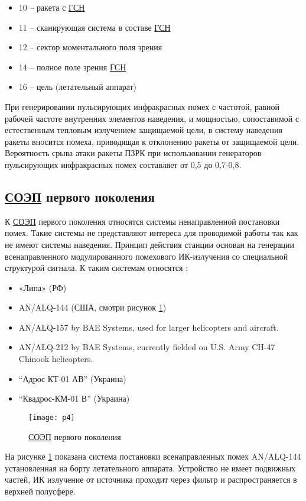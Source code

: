 \begin{itemize}
	\item 10 – ракета с \hyperref[acroGSN]{ГСН}
	\item 11 – сканирующая система в составе \hyperref[acroGSN]{ГСН}
	\item 12 – сектор моментального поля зрения
	\item 14 – полное поле зрения \hyperref[acroGSN]{ГСН}
	\item 16 – цель (летательный аппарат)	
\end{itemize}
	
При генерировании пульсирующих инфракрасных помех с частотой, равной рабочей частоте внутренних элементов наведения, и мощностью, сопоставимой с естественным тепловым излучением защищаемой цели, в систему наведения ракеты вносится помеха, приводящая к отклонению ракеты от защищаемой цели. Вероятность срыва атаки ракеты ПЗРК при использовании генераторов пульсирующих инфракрасных помех составляет от 0,5 до 0,7-0,8.

\subsection{ \hyperref[acroSOEP]{СОЭП} первого поколения}	

К  \hyperref[acroSOEP]{СОЭП} первого поколения относятся системы ненаправленной постановки помех. Такие системы не представляют интереса для проводимой работы так как не имеют системы наведения. Принцип действия станции основан на генерации всенаправленного модулированного помехового ИК-излучения со специальной структурой сигнала. К таким системам относятся \cite[]{SOEP_LIPA}:

\begin{itemize}
	\item «Липа» (РФ)	
	\item AN/ALQ-144 (США, смотри рисунок \ref{fig:alq})	
	\item AN/ALQ-157 by BAE Systems, used for larger helicopters and aircraft.
	\item AN/ALQ-212 by BAE Systems, currently fielded on U.S. Army CH-47 Chinook helicopters.
	\item “Адрос КТ-01 АВ” (Украина)
	\item “Квадрос-КМ-01 В” (Украина) 		
\end{itemize}

\begin{figure}[ht]
	\centering
	\texttt{[image: p4]} 
	\caption{ \hyperref[acroSOEP]{СОЭП} первого поколения}
	\label{fig:alq}
\end{figure}
На рисунке \ref{fig:alq} показана система постановки всенаправленных помех AN/ALQ-144 установленная на борту летательного аппарата. Устройство не имеет подвижных частей, ИК излучение от источника проходит через фильтр и распространяется в верхней полусфере.

